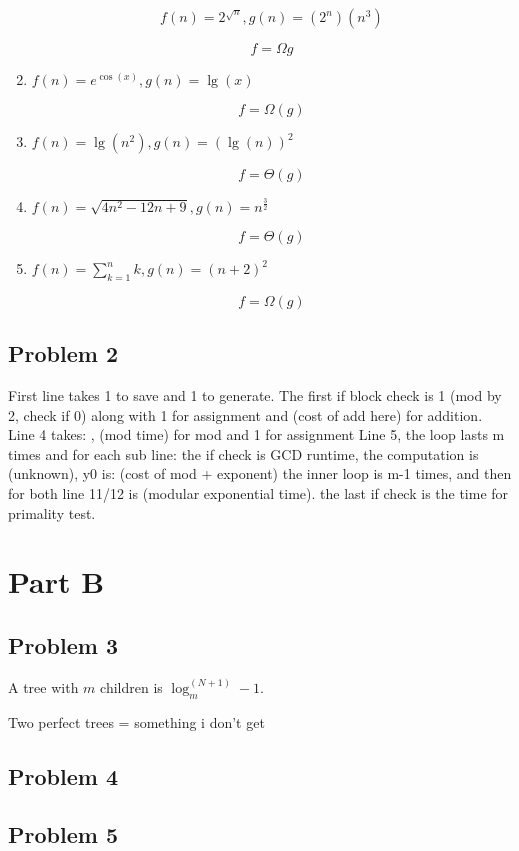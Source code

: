 \documentclass[11pt]{article}
\begin{document}
\begin{enumerate}
\[ f(n) = 2^{\sqrt{n}}, g(n) = (2^n) (n^3) \]

\[f = \Omega{g}\]

\item $f(n) = e^{\cos(x)}, g(n) = \lg(x)$

\[ f = \Omega(g) \]

\item $ f(n) = \lg(n^2), g(n) = (\lg(n))^2 $

\[ f = \Theta(g) \]

\item $ f(n) = \sqrt{4n^2 - 12n + 9}, g(n) = n^{\frac{3}{2}} $

\[ f = \Theta(g) \]

\item $ f(n) = \sum_{k = 1}^{n} k, g(n) = (n + 2)^2 $

\[ f = \Omega(g) \]

\end{enumerate}

\subsection*{Problem 2}
First line takes 1 to save and 1 to generate.
The first if block check is 1 (mod by 2, check if 0) along with 1 for assignment and (cost of add here) for addition.
Line 4 takes: , (mod time) for mod and 1 for assignment
Line 5, the loop lasts m times and for each sub line: the if check is GCD runtime, the computation is (unknown), y0 is: (cost of mod + exponent)
the inner loop is m-1 times, and then for both line 11/12 is (modular exponential time). the last if check is the time for primality test.


\section*{Part B}

\subsection*{Problem 3}
A tree with $m$ children is $\log_m^(N+1)-1$.

Two perfect trees = something i don't get

\subsection*{Problem 4}

\subsection*{Problem 5}
\end{document}
